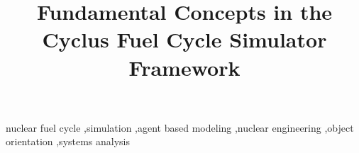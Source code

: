 \documentclass[3p,twocolumn]{elsarticle}
\begin{document}
\begin{frontmatter}

\title{Fundamental Concepts in the Cyclus Fuel Cycle Simulator Framework}







\begin{keyword}
nuclear fuel cycle \sep simulation \sep agent based modeling \sep nuclear engineering \sep object orientation \sep systems analysis
\end{keyword}

\end{frontmatter}









\end{document}
